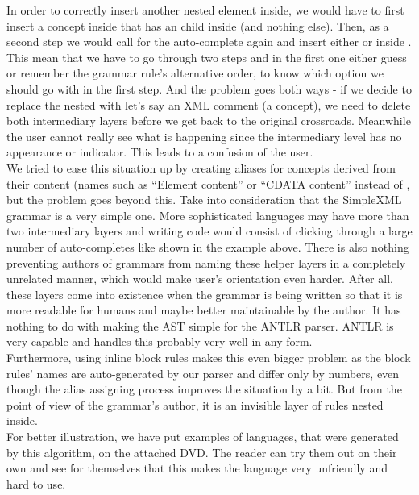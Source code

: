 In order to correctly insert another nested element inside, we would have to first insert a  concept inside  that has an  child inside (and nothing else). Then, as a second step we would call for the auto-complete again and insert either  or  inside . This mean that we have to go through two steps and in the first one either guess or remember the grammar rule's alternative order, to know which option we should go with in the first step. And the problem goes both ways - if we decide to replace the nested  with let's say an XML comment (a  concept), we need to delete both intermediary layers before we get back to the original  crossroads. Meanwhile the user cannot really see what is happening since the intermediary level has no appearance or indicator. This leads to a confusion of the user.
\\

We tried to ease this situation up by creating aliases for concepts derived from their content (names such as “Element content” or “CDATA content” instead of , but the problem goes beyond this. Take into consideration that the SimpleXML grammar is a very simple one. More sophisticated languages may have more than two intermediary layers and writing code would consist of clicking through a large number of auto-completes like shown in the example above. There is also nothing preventing authors of grammars from naming these helper layers in a completely unrelated manner, which would make user's orientation even harder. After all, these layers come into existence when the grammar is being written so that it is more readable for humans and maybe better maintainable by the author. It has nothing to do with making the AST simple for the ANTLR parser. ANTLR is very capable and handles this probably very well in any form. 
\\

Furthermore, using inline block rules makes this even bigger problem as the block rules' names are auto-generated by our parser and differ only by numbers, even though the alias assigning process improves the situation by a bit. But from the point of view of the grammar's author, it is an invisible layer of rules nested inside.
\\

For better illustration, we have put examples of languages, that were generated by this algorithm, on the attached DVD. The reader can try them out on their own and see for themselves that this makes the language very unfriendly and hard to use.
